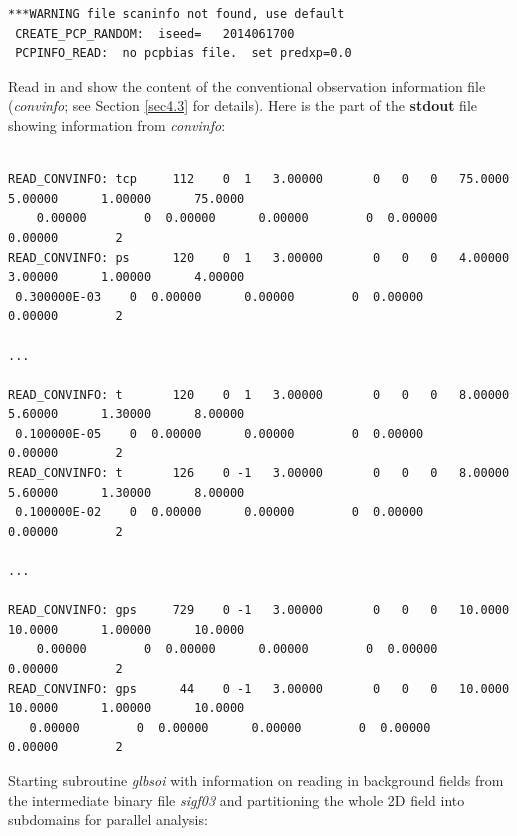 \begin{scriptsize}
\begin{verbatim}
***WARNING file scaninfo not found, use default
 CREATE_PCP_RANDOM:  iseed=   2014061700
 PCPINFO_READ:  no pcpbias file.  set predxp=0.0
\end{verbatim}
\end{scriptsize}
Read in and show the content of the conventional observation information file (\textit{convinfo}; see Section \ref{sec4.3} for details). Here is the part of the \textbf{stdout} file showing information from \textit{convinfo}:
\begin{tiny}
\begin{verbatim} 

READ_CONVINFO: tcp     112    0  1   3.00000       0   0   0   75.0000      5.00000      1.00000      75.0000  
    0.00000        0  0.00000      0.00000        0  0.00000      0.00000        2
READ_CONVINFO: ps      120    0  1   3.00000       0   0   0   4.00000      3.00000      1.00000      4.00000    
 0.300000E-03    0  0.00000      0.00000        0  0.00000      0.00000        2

...

READ_CONVINFO: t       120    0  1   3.00000       0   0   0   8.00000      5.60000      1.30000      8.00000    
 0.100000E-05    0  0.00000      0.00000        0  0.00000      0.00000        2
READ_CONVINFO: t       126    0 -1   3.00000       0   0   0   8.00000      5.60000      1.30000      8.00000    
 0.100000E-02    0  0.00000      0.00000        0  0.00000      0.00000        2

...

READ_CONVINFO: gps     729    0 -1   3.00000       0   0   0   10.0000      10.0000      1.00000      10.0000  
    0.00000        0  0.00000      0.00000        0  0.00000      0.00000        2
READ_CONVINFO: gps      44    0 -1   3.00000       0   0   0   10.0000      10.0000      1.00000      10.0000   
   0.00000        0  0.00000      0.00000        0  0.00000      0.00000        2

\end{verbatim}
\end{tiny}
Starting subroutine \textit{glbsoi} with information on reading in background fields from the intermediate binary file \textit{sigf03} and partitioning the whole 2D field into subdomains for parallel analysis:

